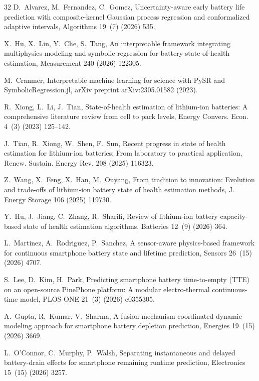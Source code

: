 \documentclass[a4paper,fleqn]{cas-sc}
\begin{document}
\begin{thebibliography}{32}
D.~Alvarez, M.~Fernandez, C.~Gomez, Uncertainty-aware early battery life prediction with composite-kernel Gaussian process regression and conformalized adaptive intervals, Algorithms 19~(7) (2026) 535.

X.~Hu, X.~Lin, Y.~Che, S.~Tang, An interpretable framework integrating multiphysics modeling and symbolic regression for battery state-of-health estimation, Measurement 240 (2026) 122305.

M.~Cranmer, Interpretable machine learning for science with PySR and SymbolicRegression.jl, arXiv preprint arXiv:2305.01582 (2023).

R.~Xiong, L.~Li, J.~Tian, State-of-health estimation of lithium-ion batteries: A comprehensive literature review from cell to pack levels, Energy Convers. Econ. 4~(3) (2023) 125--142.

J.~Tian, R.~Xiong, W.~Shen, F.~Sun, Recent progress in state of health estimation for lithium-ion batteries: From laboratory to practical application, Renew. Sustain. Energy Rev. 208 (2025) 116323.

Z.~Wang, X.~Feng, X.~Han, M.~Ouyang, From tradition to innovation: Evolution and trade-offs of lithium-ion battery state of health estimation methods, J. Energy Storage 106 (2025) 119730.

Y.~Hu, J.~Jiang, C.~Zhang, R.~Sharifi, Review of lithium-ion battery capacity-based state of health estimation algorithms, Batteries 12~(9) (2026) 364.

L.~Martinez, A.~Rodriguez, P.~Sanchez, A sensor-aware physics-based framework for continuous smartphone battery state and lifetime prediction, Sensors 26~(15) (2026) 4707.

S.~Lee, D.~Kim, H.~Park, Predicting smartphone battery time-to-empty (TTE) on an open-source PinePhone platform: A modular electro-thermal continuous-time model, PLOS ONE 21~(3) (2026) e0355305.

A.~Gupta, R.~Kumar, V.~Sharma, A fusion mechanism-coordinated dynamic modeling approach for smartphone battery depletion prediction, Energies 19~(15) (2026) 3669.

L.~O'Connor, C.~Murphy, P.~Walsh, Separating instantaneous and delayed battery-drain effects for smartphone remaining runtime prediction, Electronics 15~(15) (2026) 3257.


\end{thebibliography}
\end{document}
